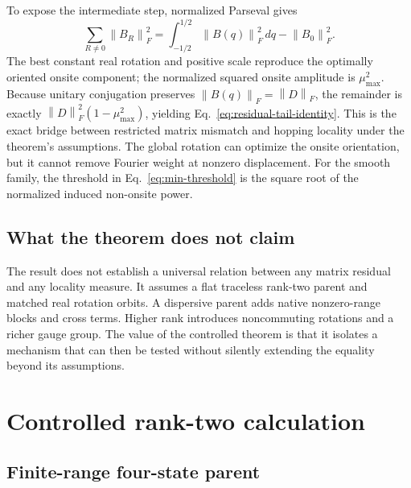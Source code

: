 \documentclass[11pt]{article}
\theoremstyle{definition}
\newcommand{\norm}[1]{\left\lVert#1\right\rVert}
\begin{document}
To expose the intermediate step, normalized Parseval gives
\begin{equation}
 \sum_{R\ne0}\norm{B_R}_F^2
 =\int_{-1/2}^{1/2}\norm{B(q)}_F^2\,dq-\norm{B_0}_F^2.
 \label{eq:rank2-parseval-intermediate}
\end{equation}
The best constant real rotation and positive scale reproduce the optimally oriented
onsite component; the normalized squared onsite amplitude is $\mu_{\max}^2$.  Because
unitary conjugation preserves $\norm{B(q)}_F=\norm D_F$, the remainder is exactly
$\norm D_F^2(1-\mu_{\max}^2)$, yielding
Eq.~\eqref{eq:residual-tail-identity}.  This is the exact bridge between restricted
matrix mismatch and hopping locality under the theorem's assumptions.  The global
rotation can optimize the onsite orientation, but it cannot remove Fourier weight at
nonzero displacement.  For the smooth family, the threshold in
Eq.~\eqref{eq:min-threshold} is the square root of the normalized induced non-onsite
power.

\subsection{What the theorem does not claim}

The result does not establish a universal relation between any matrix residual and any
locality measure.  It assumes a flat traceless rank-two parent and matched real rotation
orbits.  A dispersive parent adds native nonzero-range blocks and cross terms.  Higher
rank introduces noncommuting rotations and a richer gauge group.  The value of the
controlled theorem is that it isolates a mechanism that can then be tested without
silently extending the equality beyond its assumptions.

\section{Controlled rank-two calculation}

\subsection{Finite-range four-state parent}
\end{document}
